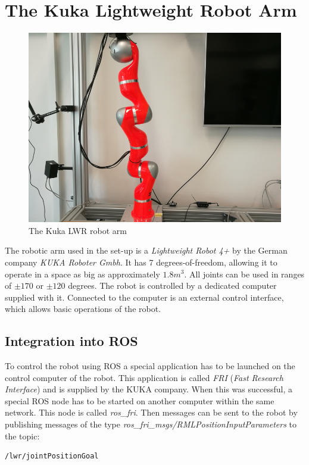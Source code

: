 \section{The Kuka Lightweight Robot Arm}

\begin{figure}
	\caption{The Kuka LWR robot arm}
	\includegraphics[width=\linewidth]{assets/chpt_basics/arm.png}
\end{figure}

The robotic arm used in the set-up is a \textit{Lightweight Robot 4+} by the German company \textit{KUKA Roboter Gmbh}. It has 7 degrees-of-freedom, allowing it to operate in a space as big as approximately $1.8m^3$\cite{Lwr2010}. All joints can be used in ranges of $\pm 170$ or $\pm 120$ degrees. The robot is controlled by a dedicated computer supplied with it. Connected to the computer is an external control interface, which allows basic operations of the robot.

\subsection{Integration into ROS}

To control the robot using ROS a special application has to be launched on the control computer of the robot. This application is called \textit{FRI} (\textit{Fast Research Interface}) and is supplied by the KUKA company\cite{Fri2010}. When this was successful, a special ROS node has to be started on another computer within the same network. This node is called \textit{ros\_fri}. Then messages can be sent to the robot by publishing messages of the type \textit{ros\_fri\_msgs/RMLPositionInputParameters} to the topic:
\begin{lstlisting}[numbers=none]
/lwr/jointPositionGoal
\end{lstlisting}

